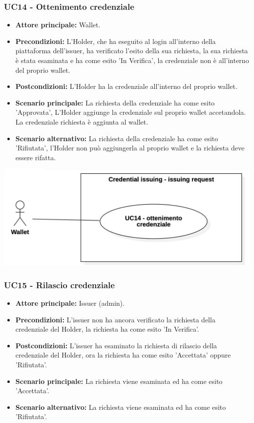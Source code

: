 \subsubsection{UC14 - Ottenimento credenziale}
\begin{itemize}
    \item \textbf{Attore principale:} Wallet.
    \item \textbf{Precondizioni:} L'Holder, che ha eseguito al login all'interno della piattaforma dell'issuer, ha verificato l'esito della sua richiesta, la sua richiesta è stata esaminata e ha come esito 'In Verifica', la credenziale non è all'interno del proprio wallet.
    \item \textbf{Postcondizioni:} L'Holder ha la credenziale all'interno del proprio wallet.
    \item \textbf{Scenario principale:} La richiesta della credenziale ha come esito 'Approvata',
    L’Holder aggiunge la credenziale sul proprio wallet accetandola.\\
    La credenziale richiesta è aggiunta al wallet.
    \item \textbf{Scenario alternativo:} La richiesta della credenziale ha come esito 'Rifiutata', l'Holder non può aggiungerla al proprio wallet e la richiesta deve essere rifatta.
\end{itemize}

\begin{center}
    \includegraphics[scale = 0.3]{./res/img/2Credential_issuing_3.png}
  \end{center}

\subsubsection{UC15 - Rilascio credenziale}
\begin{itemize}
    \item \textbf{Attore principale:} Issuer (admin).
    \item \textbf{Precondizioni:} L'issuer non ha ancora verificato la richiesta della credenziale del Holder, la richiesta ha come esito 'In Verifica'.
    \item \textbf{Postcondizioni:} L'issuer ha esaminato la richiesta di rilascio della credenziale del Holder, ora la richiesta ha come esito 'Accettata' oppure 'Rifiutata'.
    \item \textbf{Scenario principale:} La richiesta viene esaminata ed ha come esito 'Accettata'.
    \item \textbf{Scenario alternativo:} La richiesta viene esaminata ed ha come esito 'Rifiutata'.
\end{itemize}

